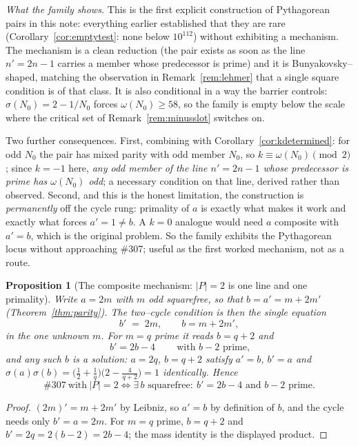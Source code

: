 \documentclass[11pt]{article}
\newtheorem{proposition}[theorem]{Proposition}
\theoremstyle{definition}
\begin{document}
\emph{What the family shows.} This is the first explicit construction of Pythagorean pairs in this note: everything earlier
established that they are rare \textup{(}Corollary~\ref{cor:emptytest}: none below $10^{112}$\textup{)}
without exhibiting a mechanism. The mechanism is a clean reduction (the pair exists as soon as the
line $n'=2n-1$ carries a member whose predecessor is prime) and it is Bunyakovsky--shaped, matching
the observation in Remark~\ref{rem:lehmer} that a single square condition is of that class. It is also
conditional in a way the barrier controls: $\sigma(N_0)=2-1/N_0$ forces $\omega(N_0)\ge58$, so the
family is empty below the scale where the critical set of Remark~\ref{rem:minusslot} switches on.

Two further consequences. First, combining with Corollary~\ref{cor:kdetermined}: for odd $N_0$ the
pair has mixed parity with odd member $N_0$, so $k\equiv\omega(N_0)\pmod2$; since $k=-1$ here,
\emph{any odd member of the line $n'=2n-1$ whose predecessor is prime has $\omega(N_0)$ odd}; a
necessary condition on that line, derived rather than observed. Second, and this is the honest
limitation, the construction is \emph{permanently} off the cycle rung: primality of $a$ is exactly
what makes it work and exactly what forces $a'=1\ne b$. A $k=0$ analogue would need $a$ composite with
$a'=b$, which is the original problem. So the family exhibits the Pythagorean locus without
approaching \#307; useful as the first worked mechanism, not as a route.


\begin{proposition}[The composite mechanism: $|P|=2$ is one line and one primality]\label{prop:compositea}
Write $a=2m$ with $m$ odd squarefree, so that $b=a'=m+2m'$ \textup{(}Theorem~\ref{thm:parity}\textup{)}.
The two--cycle condition is then the single equation
\[ b'\;=\;2m,\qquad b=m+2m', \]
in the one unknown $m$. For $m=q$ prime it reads $b=q+2$ and
\[ \boxed{\ b'=2b-4\ }\qquad\text{with } b-2 \text{ prime}, \]
and any such $b$ \emph{is} a solution: $a=2q$, $b=q+2$ satisfy $a'=b$, $b'=a$ and
$\sigma(a)\sigma(b)=\bigl(\tfrac12+\tfrac1q\bigr)\bigl(2-\tfrac4{q+2}\bigr)=1$ identically. Hence
\[ \#307\ \text{with}\ |P|=2 \iff \exists\,b \text{ squarefree}:\ b'=2b-4 \text{ and } b-2 \text{ prime}. \]
\end{proposition}
\begin{proof}
$(2m)'=m+2m'$ by Leibniz, so $a'=b$ by definition of $b$, and the cycle needs only $b'=a=2m$. For
$m=q$ prime, $b=q+2$ and $b'=2q=2(b-2)=2b-4$; the mass identity is the displayed product.
\end{proof}
\end{document}

